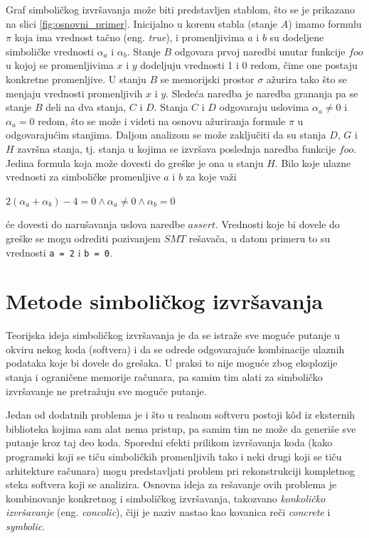 \documentclass[12pt,oneside]{memoir}
\begin{document}
Graf simboličkog izvršavanja može biti predstavljen stablom, što se je prikazano na slici \ref{fig:osnovni_primer}. Inicijalno u korenu stabla (stanje $A$) imamo formulu $\pi$ koja ima vrednost tačno (eng. \textit{true}), i promenljivima $a$ i $b$ su dodeljene simboličke vrednosti $\alpha_a$ i $\alpha_b$. Stanje $B$ odgovara prvoj naredbi unutar funkcije $foo$ u kojoj se promenljivima $x$ i $y$ dodeljuju vrednosti 1 i 0 redom, čime one postaju konkretne promenljive. U stanju $B$ se memorijski prostor $\sigma$ ažurira tako što se menjaju vrednosti promenljivih $x$ i $y$. Sledeća naredba je naredba grananja pa se stanje $B$ deli na dva stanja, $C$ i $D$. Stanja $C$ i $D$ odgovaraju uslovima $\alpha_a \neq 0$ i $\alpha_a = 0$ redom, što se može i videti na osnovu ažuriranja formule $\pi$ u odgovarajućim stanjima. Daljom analizom se može zaključiti da su stanja $D$, $G$ i $H$ završna stanja, tj. stanja u kojima se izvršava poslednja naredba funkcije $foo$. Jedina formula koja može dovesti do greške je ona u stanju $H$. Bilo koje ulazne vrednosti za simboličke promenljive $a$ i $b$ za koje važi
\vskip 0.2in
\centerline{$2(\alpha_a + \alpha_b) - 4 = 0 \land \alpha_a \neq 0 \land \alpha_b = 0$}
\vskip 0.2in
\noindent će dovesti do narušavanja uslova naredbe $assert$. Vrednosti koje bi dovele do greške se mogu odrediti pozivanjem $SMT$ rešavača, u datom primeru to su vrednosti \texttt{a = 2} i \texttt{b = 0}.

\section{Metode simboličkog izvršavanja}
Teorijska ideja simboličkog izvršavanja je da se istraže sve moguće putanje u okviru nekog koda (softvera) i da se odrede odgovarajuće kombinacije ulaznih podataka koje bi dovele do grešaka. U praksi to nije moguće zbog eksplozije stanja i ograničene memorije računara, pa samim tim alati za simboličko izvršavanje ne pretražuju sve moguće putanje. 

Jedan od dodatnih problema je i što u realnom softveru postoji k\^od iz eksternih biblioteka kojima sam alat nema pristup, pa samim tim ne može da generiše sve putanje kroz taj deo koda. Sporedni efekti prilikom izvršavanja koda (kako programski koji se tiču simboličkih promenljivih tako i neki drugi koji se tiču arhitekture računara) mogu predstavljati problem pri rekonstrukciji kompletnog steka softvera koji se analizira. Osnovna ideja za rešavanje ovih problema je kombinovanje konkretnog i simboličkog izvršavanja, takozvano \textit{konkoličko izvršavanje} (eng. \textit{concolic}), čiji je naziv nastao kao kovanica reči \textit{concrete} i \textit{symbolic}.
\end{document}
